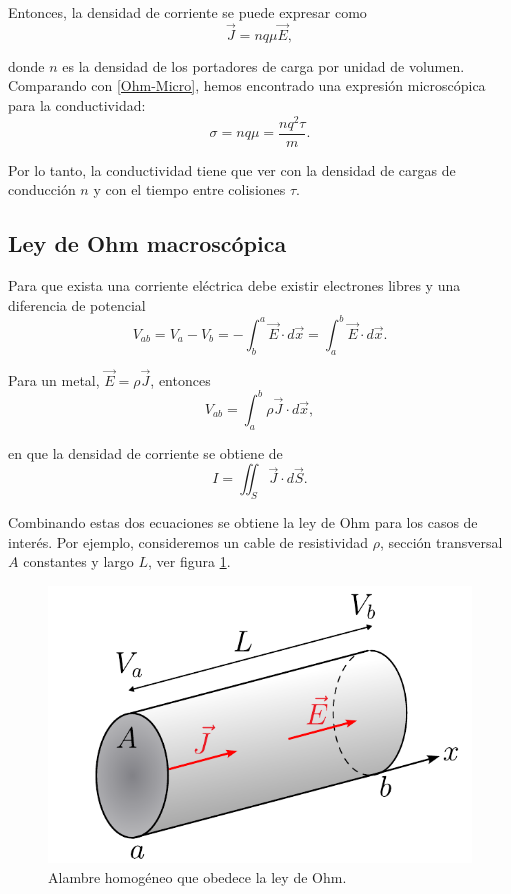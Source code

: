 Entonces, la densidad de corriente se puede expresar como
$$\vec{J} = n q \mu \vec{E},$$

donde $n$ es la densidad de los portadores de carga por unidad de volumen. Comparando con \eqref{Ohm-Micro}, hemos encontrado una expresión microscópica para la conductividad:
$$\sigma = nq \mu  = \frac{n q^2 \tau}{m}.$$

Por lo tanto, la conductividad tiene que ver con la densidad de cargas de conducción $n$ y con el tiempo entre colisiones $\tau$.

\subsection{Ley de Ohm macroscópica}

Para que exista una corriente eléctrica debe existir electrones libres y una diferencia de potencial
$$V_{ab} = V_a - V_b = - \int_b^a \vec{E} \cdot d\vec{x} = \int_a^b \vec{E} \cdot d\vec{x}.$$

Para un metal, $\vec{E} = \rho \vec{J}$,  entonces
$$V_{ab} = \int_a^b \rho \vec{J} \cdot d\vec{x},$$

en que la densidad de corriente se obtiene de
$$I = \iint_S \vec{J} \cdot d\vec{S}.$$

Combinando estas dos ecuaciones se obtiene la ley de Ohm para los casos de interés. Por ejemplo, consideremos un cable de resistividad $\rho$, sección transversal $A$ constantes y largo $L$, ver figura \ref{fig:Ley-Ohm}. 

\begin{figure}[H]
    \centering
    \includegraphics[scale = 0.7]{Figuras/Ley-Ohm.pdf}
    \caption{Alambre homogéneo que obedece la ley de Ohm.}
    \label{fig:Ley-Ohm}
\end{figure}

